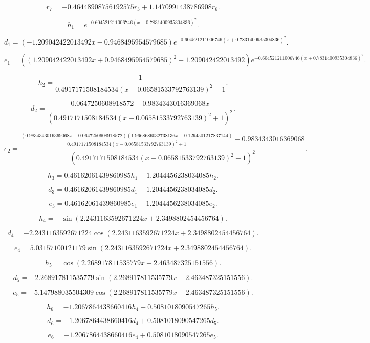 \[r_{7}=- 0.46448908756192575 r_{3} + 1.1470991438786908 r_{6}.\]

\[h_{1}=e^{- 0.604521211006746 \left(x + 0.7831400935304836\right)^{2}}.\]

\[d_{1}=\left(- 1.209042422013492 x - 0.9468495954579685\right) e^{- 0.604521211006746 \left(x + 0.7831400935304836\right)^{2}}.\]

\[e_{1}=\left(\left(1.209042422013492 x + 0.9468495954579685\right)^{2} - 1.209042422013492\right) e^{- 0.604521211006746 \left(x + 0.7831400935304836\right)^{2}}.\]

\[h_{2}=\frac{1}{0.4917171508184534 \left(x - 0.06581533792763139\right)^{2} + 1}.\]

\[d_{2}=\frac{0.0647250608918572 - 0.9834343016369068 x}{\left(0.4917171508184534 \left(x - 0.06581533792763139\right)^{2} + 1\right)^{2}}.\]

\[e_{2}=\frac{\frac{\left(0.9834343016369068 x - 0.0647250608918572\right) \left(1.9668686032738136 x - 0.1294501217837144\right)}{0.4917171508184534 \left(x - 0.06581533792763139\right)^{2} + 1} - 0.9834343016369068}{\left(0.4917171508184534 \left(x - 0.06581533792763139\right)^{2} + 1\right)^{2}}.\]

\[h_{3}=0.46162061439860985 h_{1} - 1.2044456238034085 h_{2}.\]

\[d_{3}=0.46162061439860985 d_{1} - 1.2044456238034085 d_{2}.\]

\[e_{3}=0.46162061439860985 e_{1} - 1.2044456238034085 e_{2}.\]

\[h_{4}=- \sin{\left(2.2431163592671224 x + 2.3498802454456764 \right)}.\]

\[d_{4}=- 2.2431163592671224 \cos{\left(2.2431163592671224 x + 2.3498802454456764 \right)}.\]

\[e_{4}=5.03157100121179 \sin{\left(2.2431163592671224 x + 2.3498802454456764 \right)}.\]

\[h_{5}=\cos{\left(2.268917811535779 x - 2.463487325151556 \right)}.\]

\[d_{5}=- 2.268917811535779 \sin{\left(2.268917811535779 x - 2.463487325151556 \right)}.\]

\[e_{5}=- 5.147988035504309 \cos{\left(2.268917811535779 x - 2.463487325151556 \right)}.\]

\[h_{6}=- 1.2067864438660416 h_{4} + 0.5081018090547265 h_{5}.\]

\[d_{6}=- 1.2067864438660416 d_{4} + 0.5081018090547265 d_{5}.\]

\[e_{6}=- 1.2067864438660416 e_{4} + 0.5081018090547265 e_{5}.\]

